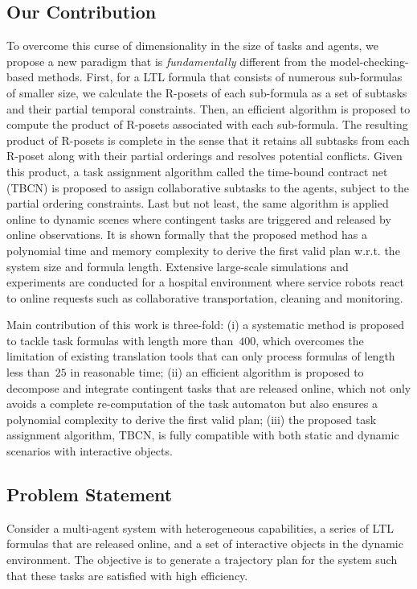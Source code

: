 \subsection{Our Contribution}
To overcome this curse of dimensionality in the size of tasks and agents,
we propose a new paradigm that is \emph{fundamentally} different from
the model-checking-based methods.
First, for a LTL formula that consists of numerous sub-formulas of smaller size,
we calculate the R-posets of each sub-formula as a set of subtasks and
their partial temporal constraints.
Then, an efficient algorithm is proposed to compute the product of
R-posets associated with each sub-formula.
{The resulting product of R-posets is complete in the sense}
that it retains all subtasks from each R-poset along with their partial orderings
and resolves potential conflicts.
Given this product,
a task assignment algorithm called the time-bound contract net (TBCN) is proposed to
assign collaborative subtasks to the agents,
subject to the partial ordering constraints.
Last but not least, the same algorithm is applied online to dynamic scenes
where contingent tasks are
triggered and released by online observations.
It is shown formally that the proposed method has a polynomial time
and memory complexity to derive the first valid plan
w.r.t. the system size and formula length.
Extensive large-scale simulations and experiments are conducted
for a hospital environment where service robots react
to online requests such as collaborative transportation,
cleaning and monitoring.



Main contribution of this work is three-fold:
(i) a systematic method is proposed to tackle task formulas with length more than~$400$,
which overcomes the limitation of existing translation tools that can only process
formulas of length less than~$25$ in reasonable time;
(ii) an efficient algorithm is proposed to decompose and integrate
contingent tasks that are released online,
which not only avoids a complete re-computation of the task automaton
but also ensures a polynomial complexity to derive the first valid plan;
(iii) the proposed task assignment algorithm, TBCN, is fully compatible with
both static and dynamic scenarios with interactive objects.

\subsection{Problem Statement}
{Consider a multi-agent system with heterogeneous capabilities,
  a series of LTL formulas that are released online,
  and a set of interactive objects in the dynamic environment.
  The objective is to generate a trajectory plan for the system such that
  these tasks are satisfied with high efficiency.}


